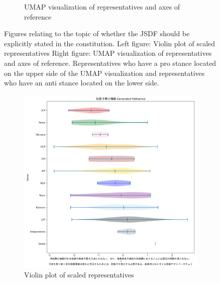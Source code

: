 \documentclass[final,5p,times,twocolumn,authoryear]{elsarticle}
\begin{document}
\begin{figure}[h]
\begin{subfigure}{0.22\textwidth}
      \caption{UMAP visualization of representatives and axes of reference}
    \end{subfigure}
\caption{Figures relating to the topic of whether the JSDF should be explicitly stated in the constitution.
Left figure: Violin plot of scaled representatives
Right figure: UMAP visualization of representatives and axes of reference. Representatives who have a pro stance located on the upper side of the UMAP visualization and representatives who have an anti stance located on the lower side.}
\label{fig: results-defence-constitution}
\end{figure}
\begin{figure}[h]
\centering
    \begin{subfigure}{0.22\textwidth}
      \centering
      \includegraphics[width=1\linewidth]{figs/results/defence/defencebudget_gen_violin_plot.png}
      \caption{Violin plot of scaled representatives}
    \end{subfigure}
    \begin{subfigure}{0.22\textwidth}
      \centering

\end{subfigure}
\end{figure}
\end{document}
